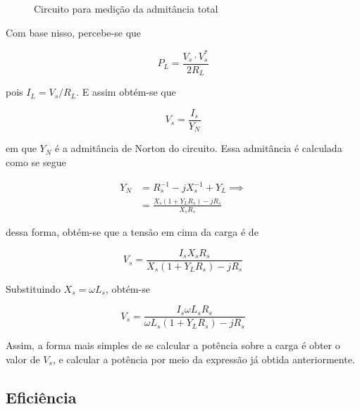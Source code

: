 \documentclass[
  number,
  preprint]{elsarticle}
\begin{document}
\begin{figure}


\caption{\label{fig-original-circuit}Circuito para medição da admitância
total}

\end{figure}%

Com base nisso, percebe-se que

\[
  P_L=\frac{V_s\cdot V_s^*}{2R_L}
\]

pois \(I_L=V_s/R_L\). E assim obtém-se que

\[
  V_s=\frac{I_s}{Y_N}
\]

em que \(Y_N\) é a admitância de Norton do circuito. Essa admitância é
calculada como se segue

\[
  \begin{split}
    Y_N&=R_s^{-1}-jX_s^{-1}+Y_L\implies\\
    &=\frac{X_s\left(1+Y_LR_s\right)-jR_s}{X_sR_s}
  \end{split}
\]

dessa forma, obtém-se que a tensão em cima da carga é de

\[
  V_s=\frac{I_sX_sR_s}{X_s\left(1+Y_LR_s\right)-jR_s}
\]

Substituindo \(X_s=\omega L_s\), obtém-se

\[
  V_s=\frac{I_s\omega L_sR_s}{\omega L_s\left(1+Y_LR_s\right)-jR_s}
\]

Assim, a forma mais simples de se calcular a potência sobre a carga é
obter o valor de \(V_s\), e calcular a potência por meio da expressão já
obtida anteriormente.

\subsection{Eficiência}\label{eficiuxeancia}
\end{document}
